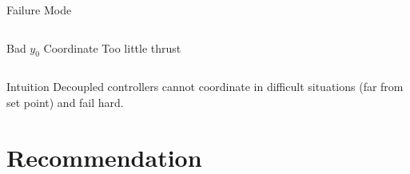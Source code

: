 \documentclass[xetex, smaller, aspectratio=43]{beamer}
\begin{document}
\begin{frame}[fragile]{Failure Mode}
\begin{columns}[T]
    \begin{column}{.33\linewidth}
      \begin{exampleblock}{Bad $y_0$ Coordinate}
        Too little thrust \\[.5em]
      \end{exampleblock}
    \end{column}
  \end{columns}

  \begin{alertblock}{Intuition}
    Decoupled controllers cannot coordinate in difficult situations (far from set point) and fail hard.
  \end{alertblock}
\end{frame}

\section{Recommendation}
\end{document}
